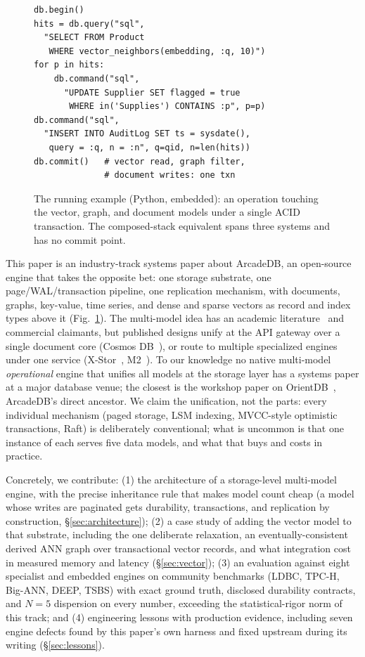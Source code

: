 \documentclass[conference]{IEEEtran}
\newcommand{\arcadedb}{ArcadeDB}
\begin{document}
\begin{figure}[t]
\begin{footnotesize}
\begin{verbatim}
db.begin()
hits = db.query("sql",
  "SELECT FROM Product
   WHERE vector_neighbors(embedding, :q, 10)")
for p in hits:
    db.command("sql",
      "UPDATE Supplier SET flagged = true
       WHERE in('Supplies') CONTAINS :p", p=p)
db.command("sql",
  "INSERT INTO AuditLog SET ts = sysdate(),
   query = :q, n = :n", q=qid, n=len(hits))
db.commit()   # vector read, graph filter,
              # document writes: one txn
\end{verbatim}
\end{footnotesize}
\caption{The running example (Python, embedded): an operation touching the
vector, graph, and document models under a single ACID transaction. The
composed-stack equivalent spans three systems and has no commit point.}
\label{fig:example}
\end{figure}

This paper is an industry-track systems paper about \arcadedb{}, an
open-source engine that takes the opposite bet: one storage substrate, one
page/WAL/transaction pipeline, one replication mechanism, with documents,
graphs, key-value, time series, and dense and sparse vectors as record and
index types above it (Fig.~\ref{fig:example}). The multi-model idea has an
academic
literature~\cite{lu2019multimodel,zhang2018unibench,m2bench} and commercial
claimants, but published designs unify at the API gateway over a single
document core (Cosmos DB~\cite{shukla2015documentdb}), or route to multiple
specialized engines under one service (X-Stor~\cite{lei2024xstor},
M2~\cite{kim2025m2}). To our knowledge no native multi-model
\emph{operational} engine that unifies all models at the storage layer has a
systems paper at a major database venue; the closest is the workshop paper on
OrientDB~\cite{ritter2021orientdb}, \arcadedb{}'s direct ancestor. We claim
the unification, not the parts: every individual mechanism (paged storage,
LSM indexing, MVCC-style optimistic transactions, Raft) is deliberately
conventional; what is uncommon is that one instance of each serves five data
models, and what that buys and costs in practice.

Concretely, we contribute: (1) the architecture of a storage-level
multi-model engine, with the precise inheritance rule that makes model count
cheap (a model whose writes are paginated gets durability, transactions, and
replication by construction, \S\ref{sec:architecture}); (2) a case study of
adding the vector model to that substrate, including the one deliberate
relaxation, an eventually-consistent derived ANN graph over transactional
vector records, and what integration cost in measured
memory and latency (\S\ref{sec:vector}); (3) an evaluation against eight
specialist and embedded engines on community benchmarks (LDBC, TPC-H,
Big-ANN, DEEP, TSBS) with exact ground truth, disclosed durability contracts,
and $N{=}5$ dispersion on every number, exceeding the statistical-rigor norm
of this track; and (4) engineering lessons with production evidence,
including seven engine defects found by this paper's own harness and fixed
upstream during its writing (\S\ref{sec:lessons}).
\end{document}

